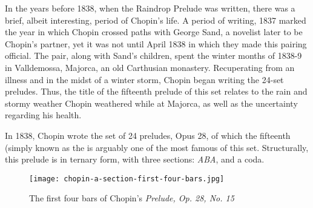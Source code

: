 In the years before 1838, when the Raindrop Prelude was written, there was a brief, albeit interesting, period of Chopin's life. A period of writing, 1837 marked the year in which Chopin crossed paths with George Sand, a novelist later to be Chopin's partner, yet it was not until April 1838 in which they made this pairing official. The pair, along with Sand's children, spent the winter months of 1838-9 in Valldemossa, Majorca, an old Carthusian monastery. Recuperating from an illness and in the midst of a winter storm, Chopin began writing the 24-set preludes\autocite{Samson_2001}. Thus, the title of the fifteenth prelude of this set relates to the rain and stormy weather Chopin weathered while at Majorca, as well as the uncertainty regarding his health.

In 1838, Chopin wrote the set of 24 preludes, Opus 28, of which the fifteenth (simply known as the  is arguably one of the most famous of this set. Structurally, this prelude is in ternary form, with three sections: \textit{ABA}, and a coda. 

\begin{figure}[h]
  \centering
  \texttt{[image: chopin-a-section-first-four-bars.jpg]}
  \caption{The first four bars of Chopin's \textit{Prelude, Op. 28, No. 15}}
  \label{fig:chopin-a-section-first-four-bars}
\end{figure}

